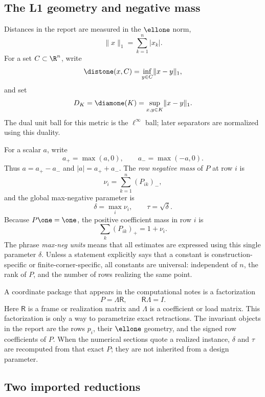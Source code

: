 \subsection{The L1 geometry and negative mass}

Distances in the report are measured in the \(\ellone\) norm,
\[
  \lVert x\rVert_1=\sum_{k=1}^n |x_k|.
\]
For a set \(C\subset\R^n\), write
\[
  \distone(x,C)=\inf_{y\in C}\lVert x-y\rVert_1,
\]
and set
\[
  D_K=\diamone(K)=\sup_{x,y\in K}\lVert x-y\rVert_1.
\]
The dual unit ball for this metric is the \(\ell^\infty\) ball; later
separators are normalized using this duality.

For a scalar \(a\), write
\[
  a_+=\max(a,0),\qquad a_-=\max(-a,0).
\]
Thus \(a=a_+-a_-\) and \(|a|=a_++a_-\).  The \emph{row negative mass}
of \(P\) at row \(i\) is
\[
  \nu_i=\sum_{k=1}^n (P_{ik})_-,
\]
and the global max-negative parameter is
\[
  \delta=\max_i \nu_i,\qquad \tau=\sqrt{\delta}.
\]
Because \(P\one=\one\), the positive coefficient mass in row \(i\) is
\[
  \sum_k (P_{ik})_+=1+\nu_i.
\]
The phrase \emph{max-neg units} means that all estimates are expressed
using this single parameter \(\delta\).  Unless a statement explicitly
says that a constant is construction-specific or finite-corner-specific,
all constants are universal: independent of \(n\), the rank of \(P\),
and the number of rows realizing the same point.

A coordinate package that appears in the computational notes is a
factorization
\[
  P=\Lambda\mathsf R,\qquad \mathsf R\Lambda=I.
\]
Here \(\mathsf R\) is a frame or realization matrix and \(\Lambda\) is
a coefficient or load matrix.  This factorization is only a way to
parametrize exact retractions.  The invariant objects in the report are
the rows \(p_i\), their \(\ellone\) geometry, and the signed row
coefficients of \(P\).  When the numerical sections quote a realized
instance, \(\delta\) and \(\tau\) are recomputed from that exact \(P\);
they are not inherited from a design parameter.

\subsection{Two imported reductions}

